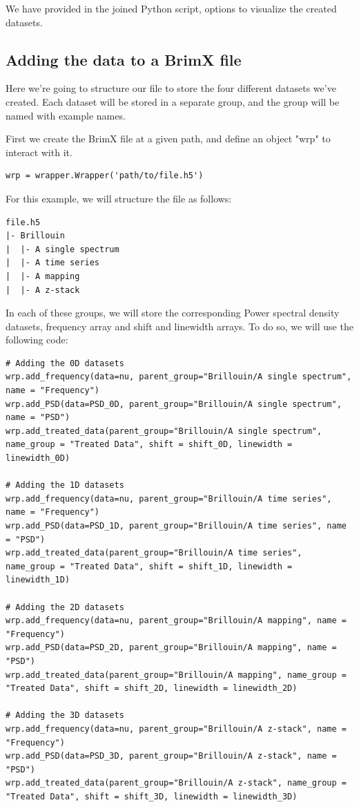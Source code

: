 \documentclass{article}
\begin{document}
We have provided in the joined Python script, options to visualize the created datasets.

\subsection{Adding the data to a BrimX file}

Here we're going to structure our file to store the four different datasets we've created. Each dataset will be stored in a separate group, and the group will be named with example names.

First we create the BrimX file at a given path, and define an object "wrp" to interact with it.
\begin{lstlisting}
wrp = wrapper.Wrapper('path/to/file.h5')
\end{lstlisting}

For this example, we will structure the file as follows:
\begin{verbatim}
file.h5
|- Brillouin
|  |- A single spectrum 
|  |- A time series
|  |- A mapping
|  |- A z-stack
\end{verbatim}

In each of these groups, we will store the corresponding Power spectral density datasets, frequency array and shift and linewidth arrays. To do so, we will use the following code:
\begin{lstlisting}
# Adding the 0D datasets
wrp.add_frequency(data=nu, parent_group="Brillouin/A single spectrum", name = "Frequency")
wrp.add_PSD(data=PSD_0D, parent_group="Brillouin/A single spectrum", name = "PSD")
wrp.add_treated_data(parent_group="Brillouin/A single spectrum", name_group = "Treated Data", shift = shift_0D, linewidth = linewidth_0D)

# Adding the 1D datasets
wrp.add_frequency(data=nu, parent_group="Brillouin/A time series", name = "Frequency")
wrp.add_PSD(data=PSD_1D, parent_group="Brillouin/A time series", name = "PSD")
wrp.add_treated_data(parent_group="Brillouin/A time series", name_group = "Treated Data", shift = shift_1D, linewidth = linewidth_1D)

# Adding the 2D datasets
wrp.add_frequency(data=nu, parent_group="Brillouin/A mapping", name = "Frequency")
wrp.add_PSD(data=PSD_2D, parent_group="Brillouin/A mapping", name = "PSD")
wrp.add_treated_data(parent_group="Brillouin/A mapping", name_group = "Treated Data", shift = shift_2D, linewidth = linewidth_2D)

# Adding the 3D datasets
wrp.add_frequency(data=nu, parent_group="Brillouin/A z-stack", name = "Frequency")
wrp.add_PSD(data=PSD_3D, parent_group="Brillouin/A z-stack", name = "PSD")
wrp.add_treated_data(parent_group="Brillouin/A z-stack", name_group = "Treated Data", shift = shift_3D, linewidth = linewidth_3D)
\end{lstlisting}
\end{document}
